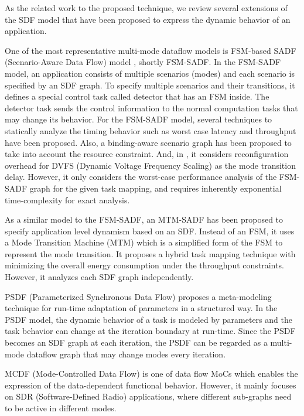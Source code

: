 \documentclass[prodmode,acmtecs]{acmsmall}
\begin{document}
As the related work to the proposed technique, we review several extensions of the SDF model that have been proposed to express the dynamic behavior of an application.

One of the most representative multi-mode dataflow models is FSM-based SADF (Scenario-Aware Data Flow) model \cite{Stuijk:2008}, shortly FSM-SADF. In the FSM-SADF model, an application consists of multiple scenarios (modes) and each scenario is specified by an SDF graph. To specify multiple scenarios and their transitions, it defines a special control task called detector that has an FSM inside. The detector task sends the control information to the normal computation tasks that may change its behavior. For the FSM-SADF model, several techniques to statically analyze the timing behavior such as worst case latency and throughput \cite{Geilen:2010} have been proposed. Also, a binding-aware scenario graph \cite{Stuijk:2010} has been proposed to take into account the resource constraint. And, in \cite{Damavandpeyma:2013}, it considers reconfiguration overhead for DVFS (Dynamic Voltage Frequency Scaling) as the mode transition delay. However, it only considers the worst-case performance analysis of the FSM-SADF graph for the given task mapping, and requires inherently exponential time-complexity for exact analysis.

As a similar model to the FSM-SADF, an MTM-SADF \cite{Jung:2014} has been proposed to specify application level dynamism based on an SDF. Instead of an FSM, it uses a Mode Transition Machine (MTM) which is a simplified form of the FSM to represent the mode transition. It proposes a hybrid task mapping technique with minimizing the overall energy consumption under the throughput constraints. However, it analyzes each SDF graph independently.

PSDF (Parameterized Synchronous Data Flow) \cite{Bhattacharya:2001} proposes a meta-modeling technique for run-time adaptation of parameters in a structured way. In the PSDF model, the dynamic behavior of a task is modeled by parameters and the task behavior can change at the iteration boundary at run-time. Since the PSDF becomes an SDF graph at each iteration, the PSDF can be regarded as a multi-mode dataflow graph that may change modes every iteration.

MCDF (Mode-Controlled Data Flow) \cite{Moreira:2012} is one of data flow MoCs which enables the expression of the data-dependent functional behavior. However, it mainly focuses on SDR (Software-Defined Radio) applications, where different sub-graphs need to be active in different modes.
\end{document}
